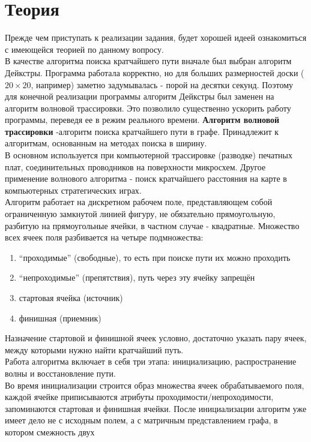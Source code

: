 \section{Теория}
\par
Прежде чем приступать к реализации задания, будет хорошей идеей
ознакомиться с имеющейся теорией по данному вопросу.\\
В качестве алгоритма поиска кратчайшего пути вначале был выбран алгоритм
Дейкстры. Программа работала корректно, но для больших размерностей доски
($20\times{20}$, например) заметно задумывалась - порой на десятки секунд.
Поэтому для конечной реализации программы алгоритм Дейкстры был заменен на
алгоритм волновой трассировки. Это позволило существенно ускорить работу программы,
переведя ее в режим реального времени.
{\bf Алгоритм волновой трассировки} -алгоритм поиска кратчайшего пути в графе. 
Принадлежит к алгоритмам, основанным на методах поиска в ширину.\\
В основном используется при компьютерной трассировке (разводке) печатных плат,
соединительных проводников на поверхности микросхем. Другое применение
волнового алгоритма - поиск кратчайшего расстояния на карте в компьютерных
стратегических играх.\\
Алгоритм работает на дискретном рабочем поле, представляющем собой
ограниченную замкнутой линией фигуру, не обязательно прямоугольную, разбитую
на прямоугольные ячейки, в частном случае - квадратные. Множество всех ячеек
поля разбивается на четыре подмножества: 
\begin{enumerate}
\item ``проходимые'' (свободные), то есть 
при поиске пути их можно проходить 
\item ``непроходимые'' (препятствия), путь через 
эту ячейку запрещён 
\item стартовая ячейка (источник)
\item финишная (приемник)
\end{enumerate}
Назначение
стартовой и финишной ячеек условно, достаточно указать пару ячеек, между
которыми нужно найти кратчайший путь.\\
Работа алгоритма включает в себя три этапа: инициализацию, распространение
волны и восстановление пути.\\
Во время инициализации строится образ множества ячеек обрабатываемого поля,
каждой ячейке приписываются атрибуты проходимости/непроходимости, запоминаются
стартовая и финишная ячейки. После инициализации алгоритм уже имеет дело не с
исходным полем, а с матричным представлением графа, в котором смежность двух
